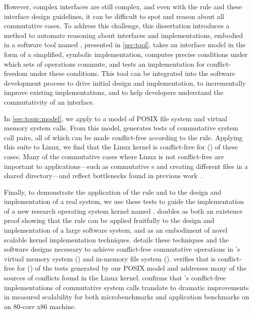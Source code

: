 However, complex interfaces are still complex, and even with the rule
and these interface design guidelines, it can be difficult to spot and
reason about all commutative cases.
%
%
To address this challenge, this dissertation introduces a method to
automate reasoning about interfaces and implementations, embodied in a
software tool named \tool, presented in \cref{sec:tool}.
%
\tool takes an interface model
in the form of a simplified, symbolic implementation, computes precise
conditions under which sets of operations commute, and tests an
implementation for conflict-freedom under these conditions.  This tool can be
integrated into the software development process to drive initial design and
implementation, to incrementally improve existing implementations, and to
help developers understand the commutativity of an interface.

In \cref{sec:topic:model}, we apply \tool to a model of
 POSIX file system and virtual memory system
calls.
%
From this model,
\tool generates  tests of commutative
system call pairs, all of which can be made conflict-free
according to the rule.
%
Applying this suite to Linux, we find that the Linux kernel is
conflict-free for 
() of
these cases.
%
Many of the commutative cases where Linux is not conflict-free are
important to applications---such as commutative
s and creating different files in a shared directory---and
reflect bottlenecks found in previous
work~\cite{boyd-wickizer:scaling}.

Finally, to demonstrate the application of the rule and \tool to the
design and implementation of a real system, we use these tests to
guide the implementation of a new research operating system kernel
named \sys.
%
\sys doubles as both an existence proof showing that the rule can be
applied fruitfully to the design and implementation of a large
software system, and as an embodiment of novel scalable kernel
implementation techniques.
%
 details these techniques and the software designs
necessary to achieve conflict-free commutative operations in \sys's
virtual memory system (\vm) and in-memory file system (\fs).
%
\tool verifies that \sys is conflict-free for
()
of the tests generated by our POSIX model and addresses many of the
sources of conflicts found in the Linux kernel.
%
 confirms that \sys's conflict-free implementations of
commutative system calls translate to dramatic improvements in
measured scalability for both microbenchmarks and application
benchmarks on an 80-core x86 machine.

